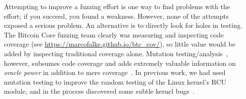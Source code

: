\lstset{style=langstyle}

Attempting to improve a fuzzing effort is one way to find problems
with the effort; if you succeed, you found a weakness.  However, none
of the attempts exposed a serious problem.  An alternative is
to directly look for holes in testing.  The Bitcoin Core fuzzing team
clearly was measuring and inspecting code coverage (see \url{https://marcofalke.github.io/btc_cov/}), so little value
would be added by inspecting traditional coverage alone.  Mutation
testing/analysis~\cite{MutationSurvey}, however, subsumes code coverage and adds extremely
valuable information on \emph{oracle power} in addition to mere
coverage~\cite{Discontents}.    In previous work, we had
used mutation testing to improve the random testing of the Linux
kernel's RCU module, and in the process discovered some subtle kernel bugs~\cite{mutKernel,groce2018verified}.

